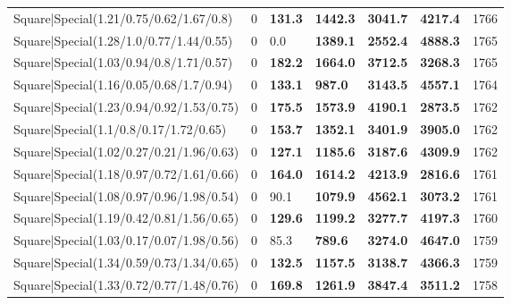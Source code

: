 \begin{tabular}{lrllllr}
 Square|Special(1.21/0.75/0.62/1.67/0.8)                       &             0   & \textbf{131.3} & \textbf{1442.3} & \textbf{3041.7} & \textbf{4217.4} &         1766 \\
 Square|Special(1.28/1.0/0.77/1.44/0.55)                       &             0   & 0.0            & \textbf{1389.1} & \textbf{2552.4} & \textbf{4888.3} &         1765 \\
 Square|Special(1.03/0.94/0.8/1.71/0.57)                       &             0   & \textbf{182.2} & \textbf{1664.0} & \textbf{3712.5} & \textbf{3268.3} &         1765 \\
 Square|Special(1.16/0.05/0.68/1.7/0.94)                       &             0   & \textbf{133.1} & \textbf{987.0}  & \textbf{3143.5} & \textbf{4557.1} &         1764 \\
 Square|Special(1.23/0.94/0.92/1.53/0.75)                      &             0   & \textbf{175.5} & \textbf{1573.9} & \textbf{4190.1} & \textbf{2873.5} &         1762 \\
 Square|Special(1.1/0.8/0.17/1.72/0.65)                        &             0   & \textbf{153.7} & \textbf{1352.1} & \textbf{3401.9} & \textbf{3905.0} &         1762 \\
 Square|Special(1.02/0.27/0.21/1.96/0.63)                      &             0   & \textbf{127.1} & \textbf{1185.6} & \textbf{3187.6} & \textbf{4309.9} &         1762 \\
 Square|Special(1.18/0.97/0.72/1.61/0.66)                      &             0   & \textbf{164.0} & \textbf{1614.2} & \textbf{4213.9} & \textbf{2816.6} &         1761 \\
 Square|Special(1.08/0.97/0.96/1.98/0.54)                      &             0   & 90.1           & \textbf{1079.9} & \textbf{4562.1} & \textbf{3073.2} &         1761 \\
 Square|Special(1.19/0.42/0.81/1.56/0.65)                      &             0   & \textbf{129.6} & \textbf{1199.2} & \textbf{3277.7} & \textbf{4197.3} &         1760 \\
 Square|Special(1.03/0.17/0.07/1.98/0.56)                      &             0   & 85.3           & \textbf{789.6}  & \textbf{3274.0} & \textbf{4647.0} &         1759 \\
 Square|Special(1.34/0.59/0.73/1.34/0.65)                      &             0   & \textbf{132.5} & \textbf{1157.5} & \textbf{3138.7} & \textbf{4366.3} &         1759 \\
 Square|Special(1.33/0.72/0.77/1.48/0.76)                      &             0   & \textbf{169.8} & \textbf{1261.9} & \textbf{3847.4} & \textbf{3511.2} &         1758 \\

\end{tabular}
